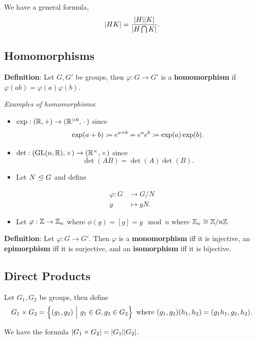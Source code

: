 We have a general formula, \[
{\left\lvert {HK} \right\rvert} = \frac{{\left\lvert {H} \right\rvert} {\left\lvert {K} \right\rvert}}{{\left\lvert {H \bigcap K} \right\rvert}}.
\]

\hypertarget{homomorphisms}{%
\subsection{Homomorphisms}\label{homomorphisms}}

\textbf{Definition}: Let \(G,G'\) be groups, then \(\varphi: G \to G'\)
is a \textbf{homomorphism} if \(\varphi(ab) = \varphi(a) \varphi(b)\).

\emph{Examples of homomorphisms}:

\begin{itemize}
\item
  \(\exp: ({\mathbb{R}}, +) \to ({\mathbb{R}}^{> 0}, {\,\cdot\,})\) since \[
  \exp(a+b) \coloneqq e^{a+b} = e^a e^b \coloneqq \exp(a) \exp(b)
  .\]
\item
  \(\det: ({\text{GL}}(n, {\mathbb{R}}), \times) \to ({\mathbb{R}}^{\times}, \times)\) since
  \[\det(AB) = \det(A) \det(B).\]
\item
  Let \(N {~\trianglelefteq~} G\) and define
\end{itemize}

\begin{align*}
\varphi: G &\to G/N \\
g &\mapsto gN
.\end{align*}

\begin{itemize}
\tightlist
\item
  Let \(\varphi: {\mathbb{Z}} \to {\mathbb{Z}}_n\) where \(\phi(g) = [g] = g \mod n\)
  where \({\mathbb{Z}}_n \cong {\mathbb{Z}}/n{\mathbb{Z}}\)
\end{itemize}

\textbf{Definition}: Let \(\varphi: G \to G'\). Then \(\varphi\) is a
\textbf{monomorphism} iff it is injective, an \textbf{epimorphism} iff
it is surjective, and an \textbf{isomorphism} iff it is bijective.

\hypertarget{direct-products}{%
\subsection{Direct Products}\label{direct-products}}

Let \(G_1, G_2\) be groups, then define \[
G_1 \times G_2 = \left\{{(g_1, g_2) {~\mathrel{\Big|}~} g_1 \in G, g_2 \in G_2}\right\} \text{ where } (g_1, g_2)(h_1, h_2) = (g_1 h_1, g_2 ,h_2).
\]

We have the formula \({\left\lvert {G_1 \times G_2} \right\rvert} = {\left\lvert {G_1} \right\rvert} {\left\lvert {G_2} \right\rvert}\).

